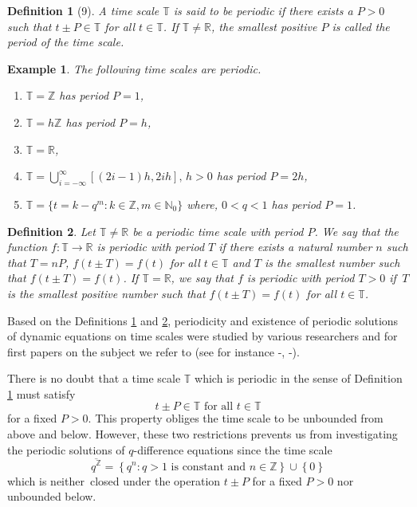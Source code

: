 \documentclass[b5paper,reqno]{amsart}\usepackage{amsfonts}
\theoremstyle{plain}
\newtheorem{definition}{Definition}
\newtheorem{example}{Example}
\numberwithin{equation}{section}
\begin{document}
\begin{definition}
[9]\label{oldperts}A time scale $\mathbb{T}$ is said to be \emph{periodic} if
there exists a $P>0$ such that $t\pm P\in\mathbb{T}$ for all $t\in\mathbb{T}$.
If $\mathbb{T}\neq\mathbb{R}$, the smallest positive $P$ is called the
\emph{period} of the time scale.
\end{definition}

\begin{example}
The following time scales are periodic.

\begin{enumerate}
\item[i.] $\mathbb{T}=\mathbb{Z}$ has period $P=1$,

\item[ii.] $\mathbb{T}=h\mathbb{Z}$ has period $P=h$,

\item[iii.] $\mathbb{T}=\mathbb{R}$,

\item[iv.] $\mathbb{T}=\bigcup_{i=-\infty}^{\infty}[(2i-1)h,2ih],\,h>0$ has
period $P=2h$,

\item[v.] $\mathbb{T}=\{t=k-q^{m}:k\in\mathbb{Z},m\in\mathbb{N}_{0}\}$ where,
$0<q<1$ has period $P=1$.
\end{enumerate}
\end{example}

\begin{definition}
\label{old per}Let $\mathbb{T}\neq\mathbb{R}$ be a periodic time scale with
period $P$. We say that the function $f\colon\mathbb{T}\rightarrow\mathbb{R}$
is periodic with period $T$ if there exists a natural number $n$ such that
$T=nP$, $f(t\pm T)=f(t)$ for all $t\in\mathbb{T}$ and $T$ is the smallest
number such that $f(t\pm T)=f(t)$. If $\mathbb{T}=\mathbb{R}$, we say that $f$
is periodic with period $T>0$ if $\,T$ is the smallest positive number such
that $f(t\pm T)=f(t)$ for all $t\in\mathbb{T}$.
\end{definition}

Based on the Definitions \ref{oldperts} and \ref{old per}, periodicity and
existence of periodic solutions of dynamic equations on time scales were
studied by various researchers and for first papers on the subject we refer to
(see for instance \cite{adivar1}-\cite{Bi&Bohner}, \cite{Kaufmann 2}-\cite{li}).

There is no doubt that a time scale $\mathbb{T}$ which is periodic in the
sense of Definition \ref{oldperts} must satisfy\begin{equation}
t\pm P\in\mathbb{T}\text{ for all }t\in\mathbb{T} \label{addition}\end{equation}
for a fixed $P>0$. This property obliges the time scale to be unbounded from
above and below. However, these two restrictions prevents us from
investigating the periodic solutions of $q$-difference equations since the
time scale
\[
\overline{q^{\mathbb{Z}}}=\left\{  q^{n}:q>1\text{ is constant and }n\in\mathbb{Z}\right\}  \cup\left\{  0\right\}
\]
which is neither\ closed under the operation $t\pm P$ for a fixed $P>0$ nor
unbounded below.
\end{document}
